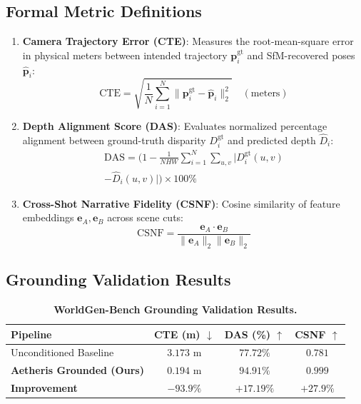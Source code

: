\documentclass[10pt,twocolumn,letterpaper]{article}
\begin{document}
\subsection{Formal Metric Definitions}
\begin{enumerate}
    \item \textbf{Camera Trajectory Error (CTE)}: Measures the root-mean-square error in physical meters between intended trajectory $\mathbf{p}_i^{\text{gt}}$ and SfM-recovered poses $\hat{\mathbf{p}}_i$:
    \begin{equation}
    \text{CTE} = \sqrt{\frac{1}{N} \sum_{i=1}^N \|\mathbf{p}_i^{\text{gt}} - \hat{\mathbf{p}}_i\|_2^2} \quad (\text{meters})
    \end{equation}
    \item \textbf{Depth Alignment Score (DAS)}: Evaluates normalized percentage alignment between ground-truth disparity $D_i^{\text{gt}}$ and predicted depth $\hat{D}_i$:
    \begin{multline}
    \text{DAS} = \bigg( 1 - \frac{1}{N H W} \sum_{i=1}^N \sum_{u, v} |D_i^{\text{gt}}(u, v) \\
    - \hat{D}_i(u, v)| \bigg) \times 100\%
    \end{multline}
    \item \textbf{Cross-Shot Narrative Fidelity (CSNF)}: Cosine similarity of feature embeddings $\mathbf{e}_A, \mathbf{e}_B$ across scene cuts:
    \begin{equation}
    \text{CSNF} = \frac{\mathbf{e}_A \cdot \mathbf{e}_B}{\|\mathbf{e}_A\|_2 \|\mathbf{e}_B\|_2}
    \end{equation}
\end{enumerate}

\subsection{Grounding Validation Results}

\begin{table}[h]
\centering
\small
\caption{\textbf{WorldGen-Bench Grounding Validation Results.}}
\label{tab:worldgen_results}
\begin{tabular}{lccc}
\toprule
\textbf{Pipeline} & \textbf{CTE (m)} $\downarrow$ & \textbf{DAS (\%)} $\uparrow$ & \textbf{CSNF} $\uparrow$ \\
\midrule
Unconditioned Baseline & $3.173\text{ m}$ & $77.72\%$ & $0.781$ \\
\textbf{Aetheris Grounded (Ours)} & \textbf{$0.194\text{ m}$} & \textbf{$94.91\%$} & \textbf{$0.999$} \\
\midrule
\textbf{Improvement} & \textbf{$-93.9\%$} & \textbf{$+17.19\%$} & \textbf{$+27.9\%$} \\
\bottomrule
\end{tabular}
\end{table}
\end{document}
